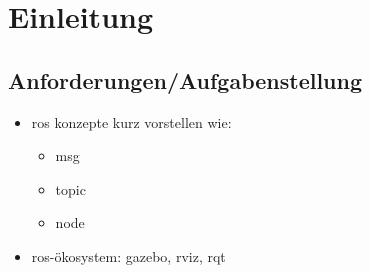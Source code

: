 \chapter{Einleitung}

\section{Anforderungen/Aufgabenstellung}

\begin{itemize}
\item ros konzepte kurz vorstellen wie:
	\begin{itemize}
	\item msg
	\item topic
	\item node
	\end{itemize}
\item ros-ökosystem: gazebo, rviz, rqt
\end{itemize}

